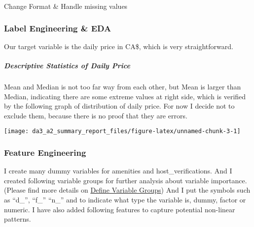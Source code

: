 \documentclass[
]{article}
\begin{document}
Change Format \& Handle missing values

\hypertarget{label-engineering-eda}{%
\subsubsection{Label Engineering \& EDA}\label{label-engineering-eda}}

Our target variable is the daily price in CA\$, which is very
straightforward.

\hypertarget{descriptive-statistics-of-daily-price}{%
\subparagraph{Descriptive Statistics of Daily
Price}\label{descriptive-statistics-of-daily-price}}

\begin{table}[H]
\centering
{}
\end{table}

Mean and Median is not too far way from each other, but Mean is larger
than Median, indicating there are some extreme values at right side,
which is verified by the following graph of distribution of daily price.
For now I decide not to exclude them, because there is no proof that
they are errors.

\begin{center}\texttt{[image: da3\_a2\_summary\_report\_files/figure-latex/unnamed-chunk-3-1]} \end{center}

\hypertarget{feature-engineering}{%
\subsubsection{Feature Engineering}\label{feature-engineering}}

I create many dummy variables for amenities and host\_verifications. And
I created following variable groups for further analysis about variable
importance. (Please find more details on
\href{https://github.com/xibei-chen/DA3/blob/main/assignment_2/define_var_groups.R}{Define
Variable Groups}) And I put the symbols such as ``d\_'', ``f\_'' ``n\_''
and to indicate what type the variable is, dummy, factor or numeric. I
have also added following features to capture potential non-linear
patterns.
\end{document}
